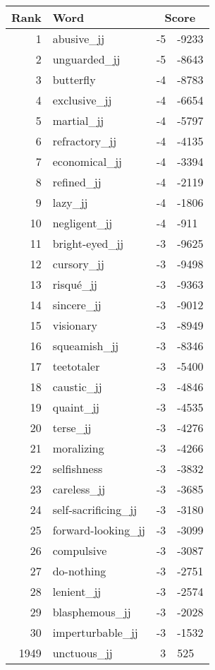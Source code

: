 \begin{longtable}[!htbp]{| rlr@{.}l |}
    \hline
    \textbf{Rank} & \textbf{Word} & \multicolumn{2}{c|}{\textbf{Score}} \\
    \hline
    \endhead
    1 & abusive\_jj & -5 & -9233 \\
    2 & unguarded\_jj & -5 & -8643 \\
    3 & butterfly & -4 & -8783 \\
    4 & exclusive\_jj & -4 & -6654 \\
    5 & martial\_jj & -4 & -5797 \\
    6 & refractory\_jj & -4 & -4135 \\
    7 & economical\_jj & -4 & -3394 \\
    8 & refined\_jj & -4 & -2119 \\
    9 & lazy\_jj & -4 & -1806 \\
    10 & negligent\_jj & -4 & -911 \\
    11 & bright-eyed\_jj & -3 & -9625 \\
    12 & cursory\_jj & -3 & -9498 \\
    13 & risqué\_jj & -3 & -9363 \\
    14 & sincere\_jj & -3 & -9012 \\
    15 & visionary & -3 & -8949 \\
    16 & squeamish\_jj & -3 & -8346 \\
    17 & teetotaler & -3 & -5400 \\
    18 & caustic\_jj & -3 & -4846 \\
    19 & quaint\_jj & -3 & -4535 \\
    20 & terse\_jj & -3 & -4276 \\
    21 & moralizing & -3 & -4266 \\
    22 & selfishness & -3 & -3832 \\
    23 & careless\_jj & -3 & -3685 \\
    24 & self-sacrificing\_jj & -3 & -3180 \\
    25 & forward-looking\_jj & -3 & -3099 \\
    26 & compulsive & -3 & -3087 \\
    27 & do-nothing & -3 & -2751 \\
    28 & lenient\_jj & -3 & -2574 \\
    29 & blasphemous\_jj & -3 & -2028 \\
    30 & imperturbable\_jj & -3 & -1532 \\
    1949 & unctuous\_jj & 3 & 525 \\

\end{longtable}
